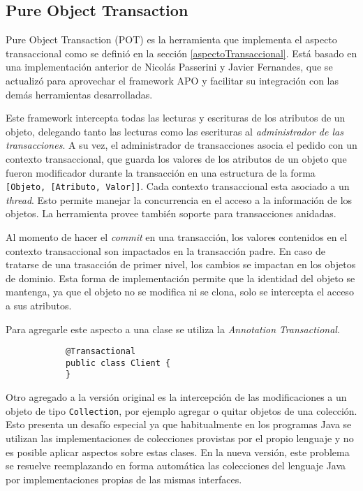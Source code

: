 \subsection{Pure Object Transaction}
	\label{pot} 
	Pure Object Transaction (POT) es la herramienta que implementa el aspecto
	transaccional como se definió en la sección \ref{aspectoTransaccional}.
	Está basado en una implementación anterior de Nicolás Passerini y Javier
	Fernandes, que se actualizó para aprovechar el framework APO y facilitar su
	integración con las demás herramientas desarrolladas.
	
	\medskip
	 
	Este framework intercepta todas las lecturas y escrituras de los atributos de
	un objeto, delegando tanto las lecturas como las escrituras al
	\emph{administrador de las transacciones}.
	A su vez, el administrador de transacciones asocia el pedido con un contexto
	transaccional, que guarda los valores de los atributos de un objeto que fueron
	modificador durante la transacción en una estructura de la forma
	\lstinline|[Objeto, [Atributo, Valor]]|.
	Cada contexto transaccional esta asociado a un \emph{thread}. Esto
	permite manejar la concurrencia en el acceso a la información de los objetos.
	La herramienta provee también soporte para transacciones anidadas.
	 
	Al momento de hacer el \emph{commit} en una transacción, los valores
	contenidos en el contexto transaccional son impactados en la transacción
	padre.
	En caso de tratarse de una trasacción de primer nivel, los cambios se impactan
	en los objetos de dominio.
	Esta forma de implementación permite que la identidad del objeto se
	mantenga, ya que el objeto no se modifica ni se clona, solo se intercepta el
	acceso a sus atributos.
	
	Para agregarle este aspecto a una clase se utiliza la \emph{Annotation}
	\emph{Transactional}.
			
		\begin{lstlisting} 
			@Transactional
			public class Client {
			}
		\end{lstlisting}
	
	\medskip
	
	Otro agregado a la versión original es la intercepción de las modificaciones 
	a un objeto de tipo \lstinline|Collection|, por ejemplo agregar o quitar
	objetos de una colección.
	Esto presenta un desafío especial ya que habitualmente en los programas Java
	se utilizan las implementaciones de colecciones provistas por el propio
	lenguaje y no es posible aplicar aspectos sobre estas clases. 
	En la nueva versión, este problema se resuelve reemplazando en forma
	automática las colecciones del lenguaje Java por
	implementaciones propias de las mismas interfaces.
